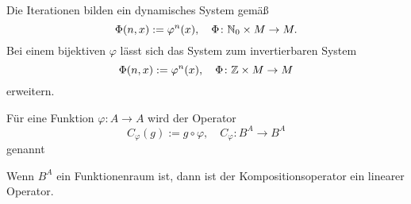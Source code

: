 Die Iterationen bilden ein dynamisches System gemäß%
\begin{equation}
\Phi(n,x):=\varphi^n(x),\quad\Phi\colon\mathbb N_0\times M\to M.
\end{equation}
Bei einem bijektiven $\varphi$ lässt sich das System zum invertierbaren
System
\begin{equation}
\Phi(n,x):=\varphi^n(x),\quad\Phi\colon\mathbb Z\times M\to M
\end{equation}
erweitern.

{}
Für eine Funktion $\varphi\colon A\to A$ wird der Operator
\begin{equation}
C_\varphi (g) := g\circ\varphi,\quad C_\varphi\colon B^A\to B^A
\end{equation}
 genannt

Wenn $B^A$ ein Funktionenraum ist, dann ist der Kompositionsoperator
ein linearer Operator.
